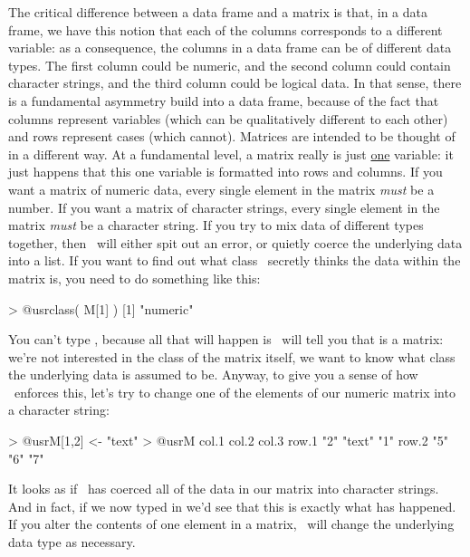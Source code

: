 The critical difference between a data frame and a matrix is that, in a data frame, we have this notion that each of the columns corresponds to a different variable: as a consequence, the columns in a data frame can be of different data types. The first column could be numeric, and the second column could contain character strings, and the third column could be logical data. In that sense, there is a fundamental asymmetry build into a data frame, because of the fact that columns represent variables (which can be qualitatively different to each other) and rows represent cases (which cannot). Matrices are intended to be thought of in a different way. At a fundamental level, a matrix really is just \underline{one} variable: it just happens that this one variable is formatted into rows and columns. If you want a matrix of numeric data, every single element in the matrix {\it must} be a number. If you want a matrix of character strings, every single element in the matrix {\it must} be a character string. If you try to mix data of different types together, then \R\ will either spit out an error, or quietly coerce the underlying data into a list. If you want to find out what class \R\ secretly thinks the data within the matrix is, you need to do something like this: 
\begin{rblock1}
> @usr{class( M[1] )}
[1] "numeric"
\end{rblock1}
You can't type , because all that will happen is \R\ will tell you that  is a matrix: we're not interested in the class of the matrix itself, we want to know what class the underlying data is assumed to be. Anyway, to give you a sense of how \R\ enforces this, let's try to change one of the elements of our numeric matrix into a character string:
\begin{rblock1}
> @usr{M[1,2] <- "text"}
> @usr{M}
      col.1 col.2  col.3
row.1 "2"   "text" "1"  
row.2 "5"   "6"    "7" 
\end{rblock1}
It looks as if \R\ has coerced all of the data in our matrix into character strings. And in fact, if we now typed in  we'd see that this is exactly what has happened. If you alter the contents of one element in a matrix, \R\ will change the underlying data type as necessary. 

